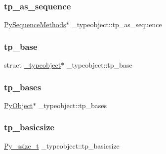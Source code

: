 \mbox{\label{struct__typeobject_af75a067303be5735b139f55a197607af}} 
\subsubsection{\texorpdfstring{tp\_as\_sequence}{tp\_as\_sequence}}
{\footnotesize\ttfamily \mbox{\hyperlink{struct_py_sequence_methods}{Py\+Sequence\+Methods}}$\ast$ \+\_\+typeobject\+::tp\+\_\+as\+\_\+sequence}

\mbox{\label{struct__typeobject_a79eba1ed6b94894bd0dc2da3ad0abbff}} 
\subsubsection{\texorpdfstring{tp\_base}{tp\_base}}
{\footnotesize\ttfamily struct \mbox{\hyperlink{struct__typeobject}{\+\_\+typeobject}}$\ast$ \+\_\+typeobject\+::tp\+\_\+base}

\mbox{\label{struct__typeobject_ac261b8254c5dc6679c5359cc262a9762}} 
\subsubsection{\texorpdfstring{tp\_bases}{tp\_bases}}
{\footnotesize\ttfamily \mbox{\hyperlink{_python27_2object_8h_aadc84ac7aed2cfa6f20c25f62bf3dac7}{Py\+Object}}$\ast$ \+\_\+typeobject\+::tp\+\_\+bases}

\mbox{\label{struct__typeobject_aede3a7181d6d3c0560c44740b805ac00}} 
\subsubsection{\texorpdfstring{tp\_basicsize}{tp\_basicsize}}
{\footnotesize\ttfamily \mbox{\hyperlink{pyport_8h_ac6411a3dfda9ac6feb9e8d859b1184bc}{Py\+\_\+ssize\+\_\+t}} \+\_\+typeobject\+::tp\+\_\+basicsize}

